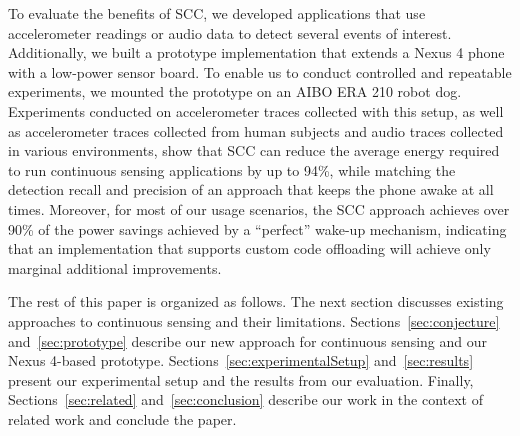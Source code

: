 To evaluate the benefits of SCC, we developed applications that use 
accelerometer readings or audio data to detect several events of 
interest.  Additionally, we built a prototype implementation that extends 
a Nexus 4 phone with a low-power sensor board.  To enable us to 
conduct controlled and repeatable experiments,
we mounted the prototype on an AIBO ERA 210 robot dog.  Experiments 
conducted on accelerometer traces collected with this setup,
as well as accelerometer traces collected from human subjects and audio
traces collected in various environments, show that
SCC can reduce the average energy required to run continuous
sensing applications by up to 94\%, while matching the detection recall
and precision of an approach that keeps the phone awake at all times.
Moreover, for most of our usage scenarios, the SCC approach
achieves over 90\% of the power savings achieved by a ``perfect''
wake-up mechanism, indicating that an implementation that supports
custom code offloading will achieve only marginal additional
improvements.

The rest of this paper is organized as follows.
The next section discusses existing approaches to
continuous sensing and their limitations.  Sections~\ref{sec:conjecture}
and~\ref{sec:prototype} describe our new approach for continuous sensing
and our Nexus 4-based prototype.  Sections~\ref{sec:experimentalSetup} 
and~\ref{sec:results} present our
experimental setup and the results from our evaluation.  Finally,
Sections~\ref{sec:related} and~\ref{sec:conclusion} describe our work
in the context of related work and conclude the paper.

